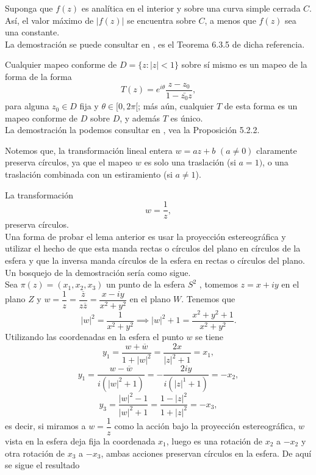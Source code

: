 \begin{teor}\label{modmx}
	Suponga que $f (z)$ es analítica en el interior y sobre una curva simple cerrada $C$. Así, el valor máximo de $| f (z)|$ se encuentra sobre $C$, a menos que $f (z)$ sea una constante.\\
	La demostración se puede consultar en \cite{marsden}, es el Teorema 6.3.5 de dicha referencia.
\end{teor}
\begin{prop}
	Cualquier mapeo conforme de $D =\{ z : |z| < 1 \}$ sobre sí mismo es un mapeo de la forma de la forma
	$$T(z)=e^{i\theta}\dfrac{z-z_{0}}{1-\bar{z_{0}}z},$$
	para alguna $z_{0}\in D$ fija y $\theta \in [0, 2\pi[$; más aún, cualquier $T$ de esta forma es un mapeo conforme de $D$ sobre $D$, y además $T$ es único.\\
	La demostración la podemos consultar en \cite{marsden}, vea la Proposición  5.2.2.

\end{prop}
Notemos que, la transformación lineal entera $w = az+b$ $(a\neq 0)$ claramente preserva círculos, ya que el mapeo $w$ es solo una traslación  (si $a = 1)$, o una traslación combinada con un estiramiento (si $a\neq 1$).
\begin{lema}\label{lema1}
	La transformación
	$$w=\dfrac{1}{z},$$
	preserva círculos.\\
Una forma de probar el lema anterior es usar la proyección estereográfica y utilizar el hecho de que esta manda rectas o círculos del plano en círculos de la esfera y
que la inversa manda círculos de la esfera en rectas o círculos del plano. Un bosquejo de la demostración sería como sigue.\\
Sea $\pi(z)=(x_1,x_2,x_3)$ un punto de la esfera $S^2$ , tomemos $z=x+iy$ en el plano $Z$ y $w=\dfrac{1}{z}=\dfrac{\overline{z}}{z\overline{z}}=\dfrac{x-iy}{x^2+y^2}$ en el plano $W$. Tenemos que 
$$|w|^2=\dfrac{1}{x^2+y^2}\implies |w|^2+1=\dfrac{x^2+y^2+1}{x^2+y^2}.$$
Utilizando las coordenadas en la esfera el punto $w$ se tiene 
$$y_1=\dfrac{w+\overline{w}}{1+|w|^2}=\dfrac{2x}{|z|^2+1}=x_1,$$
$$y_1=\dfrac{w-\overline{w}}{i(|w|^2+1)}=-\dfrac{2iy}{i(|z|^1+1)}=-x_2,$$
$$y_3=\dfrac{|w|^2-1}{|w|^2+1}=\dfrac{1-|z|^2}{1+|z|^2}=-x_3,$$
es decir, si miramos a $w=\dfrac{1}{z}$ como la acción bajo la proyección estereográfica, $w$ vista en la esfera deja fija la coordenada $x_1$, luego es una rotación de $x_2$ a $-x_2$ y otra rotación  de $x_3$ a $-x_3$, ambas acciones preservan círculos en la esfera. De aquí se sigue el resultado
\end{lema}

